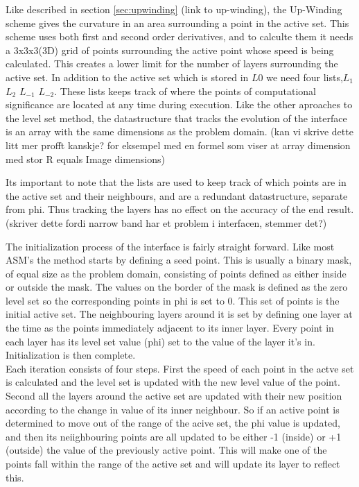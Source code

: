 Like described in section \ref{sec:upwinding} (link to up-winding), the Up-Winding scheme gives the curvature in an area surrounding a point in the active set. This scheme uses both first and second order derivatives, and to calculte them it needs a 3x3x3(3D) grid of points surrounding the active point whose speed is being calculated. This creates a lower limit for the number of layers surrounding the active set. In addition to the active set which is stored in \(L{0}\) we need four lists,\(L_{1}\)  \(L_{2}\) \(L_{-1}\) \(L_{-2}\). These lists keeps track of where the points of computational significance are located at any time during execution. Like the other aproaches to the level set method, the datastructure that tracks the evolution of the interface is an array with the same dimensions as the problem domain. (kan vi skrive dette litt mer profft kanskje? for eksempel med en formel som viser at array dimension med stor R equals Image dimensions)

Its important to note that the lists are used to keep track of which points are in the active set and their neighbours, and are a redundant datastructure, separate from phi. Thus tracking the layers has no effect on the accuracy of the end result.(skriver dette fordi narrow band har et problem i interfacen, stemmer det?)


The initialization process of the interface is fairly straight forward. Like most ASM's the method starts by defining a seed point. This is usually a binary mask, of equal size as the problem domain, consisting of points defined as either inside or outside the mask. The values on the border of the mask is defined as the zero level set so the corresponding points in phi is set to 0. This set of points is the initial active set. The neighbouring layers around it is set by defining one layer at the time as the points immediately adjacent to its inner layer. Every point in each layer has its level set value (phi) set to the value of the layer it's in. Initialization is then complete. \\

Each iteration consists of four steps. First the speed of each point in the actve set is calculated and the level set is updated with the new level value of the point. Second all the layers around the active set are updated with their new position according to the change in value of its inner neighbour.  So if an active point is determined to move out of the range of the acive set, the phi value is updated, and then its neiighbouring points are all updated to be either -1 (inside) or +1 (outside) the value of the previously active point. This will make one of the points fall within the range of the active set and will update its layer to reflect this. 






